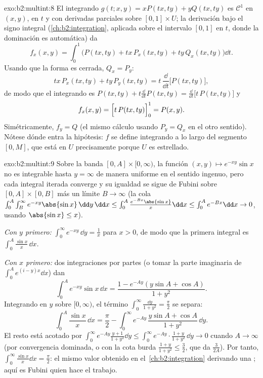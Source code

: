 \begin{solution}{exo:b2:multint:8}
El integrando $g(t; x, y) = xP(tx, ty) + yQ(tx, ty)$ es
$\mathcal{C}^1$ en $(x, y)$,  en $t$ y con derivadas
parciales  sobre $[0,1] \times U$; la derivación bajo el
signo integral (\cref{ch:b2:integration}, aplicada sobre el intervalo
 $[0,1]$ en $t$, donde la dominación es automática) da
\[
f_x(x, y)
= \int_0^1 \bigl(P(tx, ty) + tx\,P_x(tx, ty)
+ ty\,Q_x(tx, ty)\bigr)\dd t .
\]
Usando que la forma es cerrada, $Q_x = P_y$:
\[
tx\,P_x(tx, ty) + ty\,P_y(tx, ty)
= t\,\frac{\dd}{\dd t}\bigl[P(tx, ty)\bigr] ,
\]
de modo que el integrando es $P(tx, ty) + t\frac{\dd}{\dd t}P(tx,
ty) = \frac{\dd}{\dd t}\bigl[t\,P(tx, ty)\bigr]$ y
\[
f_x(x, y) = \Bigl[t\,P(tx, ty)\Bigr]_0^1 = P(x, y) .
\]
Simétricamente, $f_y = Q$ (el mismo cálculo usando $P_y = Q_x$ en el
otro sentido). Nótese dónde entra la hipótesis: $f$ se define
integrando a lo largo del segmento $[0, M]$, que está en $U$
precisamente porque $U$ es estrellado.
\end{solution}

\begin{solution}{exo:b2:multint:9}
Sobre la banda $[0, A] \times [0, \infty)$, la función $(x, y)
\mapsto e^{-xy}\sin x$ no es  integrable hasta $y =
\infty$ de manera uniforme en el sentido ingenuo, pero cada integral
iterada converge y su igualdad se sigue de Fubini sobre $[0, A]
\times [0, B]$ más un límite $B \to \infty$ (la cola
$\int_0^A\int_B^\infty e^{-xy}\abs{\sin x}\,\dd y\,\dd x \leq
\int_0^A \frac{e^{-Bx}\abs{\sin x}}{x}\dd x \leq \int_0^A e^{-Bx}
\dd x\to 0$, usando $\abs{\sin x} \leq x$).

\emph{Con $y$ primero:} $\int_0^\infty e^{-xy}\,\dd y = \frac1x$
para $x > 0$, de modo que la primera integral es $\int_0^A
\frac{\sin x}{x}\,\dd x$.

\emph{Con $x$ primero:} dos integraciones por partes (o tomar la
parte imaginaria de $\int_0^A e^{(i - y)x}\dd x$) dan
\[
\int_0^A e^{-xy}\sin x\,\dd x
= \frac{1 - e^{-Ay}(y\sin A + \cos A)}{1 + y^2} .
\]
Integrando en $y$ sobre $[0, \infty)$, el término $\int_0^\infty
\frac{\dd y}{1 + y^2} = \frac\pi2$ se separa:
\[
\int_0^A \frac{\sin x}{x}\,\dd x
= \frac{\pi}{2}
- \int_0^\infty e^{-Ay}\,\frac{y\sin A + \cos A}{1 + y^2}\,\dd y .
\]
El resto está acotado por $\int_0^\infty e^{-Ay}\frac{y + 1}{1 +
y^2}\dd y \leq \int_0^\infty e^{-Ay}\cdot\frac{1+y}{1+y^2} \,\dd y
\to 0$ cuando $A \to \infty$ (por convergencia dominada, o con la
cota burda $\frac{1 + y}{1 + y^2} \leq \frac32$, que da
$\frac{3}{2A}$). Por tanto, $\int_0^\infty\frac{\sin x}{x}\dd x =
\frac\pi2$: el mismo valor obtenido en el~\cref{ch:b2:integration}
derivando una ; aquí es Fubini quien hace el
trabajo.
\end{solution}

